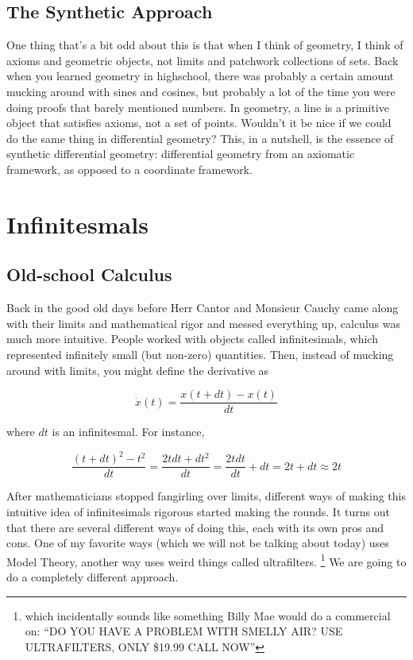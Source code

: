 \documentclass[]{book}
\begin{document}
\subsection{The Synthetic Approach}

One thing that's a bit odd about this is that when I think of geometry, I think of axioms and geometric objects, not limits and patchwork collections of sets. Back when you learned geometry in highschool, there was probably a certain amount mucking around with sines and cosines, but probably a lot of the time you were doing proofs that barely mentioned numbers. In geometry, a line is a primitive object that satisfies axioms, not a set of points. Wouldn't it be nice if we could do the same thing in differential geometry? This, in a nutshell, is the essence of synthetic differential geometry: differential geometry from an axiomatic framework, as opposed to a coordinate framework.  

\section{Infinitesmals}

\subsection{Old-school Calculus}

Back in the good old days before Herr Cantor and Monsieur Cauchy came along with their limits and mathematical rigor and messed everything up, calculus was much more intuitive. People worked with objects called infinitesimals, which represented infinitely small (but non-zero) quantities. Then, instead of mucking around with limits, you might
define the derivative as

\[ \dot{x}(t) = \frac{x(t + dt) - x(t)}{dt} \]

where $dt$ is an infinitesmal. For instance,

\[ \frac{(t + dt)^2 - t^2}{dt} = \frac{2tdt+dt^2}{dt} = \frac{2tdt}{dt} + dt = 2t + dt \approx 2t \]

After mathematicians stopped fangirling over limits, different ways of making this intuitive idea of infinitesimals rigorous started making the rounds. It turns out that there are several different ways of doing this, each with its own pros and cons. One of my favorite ways (which we will not be talking about today) uses Model Theory, another way uses weird things called ultrafilters. \footnote{which incidentally sounds like something Billy Mae would do a commercial on: ``DO YOU HAVE A PROBLEM WITH SMELLY AIR? USE ULTRAFILTERS, ONLY \$19.99 CALL NOW''} We are going to do a completely different approach.
\end{document}
